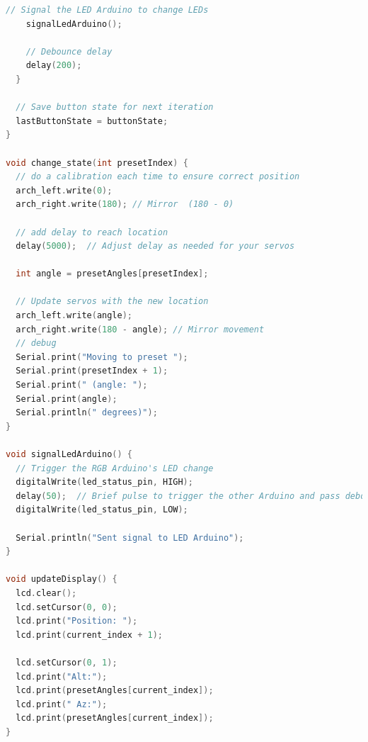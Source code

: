 \begin{lstlisting}[style=cstyle, caption=C++ Code of the ARCH Arduino, label=lst:ArchCode, language=c++ ]
    // Signal the LED Arduino to change LEDs
    signalLedArduino();
    
    // Debounce delay
    delay(200);
  }
  
  // Save button state for next iteration
  lastButtonState = buttonState;
}

void change_state(int presetIndex) {
  // do a calibration each time to ensure correct position
  arch_left.write(0);
  arch_right.write(180); // Mirror  (180 - 0)
  
  // add delay to reach location
  delay(5000);  // Adjust delay as needed for your servos

  int angle = presetAngles[presetIndex];
  
  // Update servos with the new location
  arch_left.write(angle);
  arch_right.write(180 - angle); // Mirror movement
  // debug
  Serial.print("Moving to preset ");
  Serial.print(presetIndex + 1);
  Serial.print(" (angle: ");
  Serial.print(angle);
  Serial.println(" degrees)");
}

void signalLedArduino() {
  // Trigger the RGB Arduino's LED change
  digitalWrite(led_status_pin, HIGH);
  delay(50);  // Brief pulse to trigger the other Arduino and pass debounce check
  digitalWrite(led_status_pin, LOW);
  
  Serial.println("Sent signal to LED Arduino");
}

void updateDisplay() {
  lcd.clear();
  lcd.setCursor(0, 0);
  lcd.print("Position: ");
  lcd.print(current_index + 1);  
  
  lcd.setCursor(0, 1);
  lcd.print("Alt:");
  lcd.print(presetAngles[current_index]);
  lcd.print(" Az:");
  lcd.print(presetAngles[current_index]);
}
\end{lstlisting}

